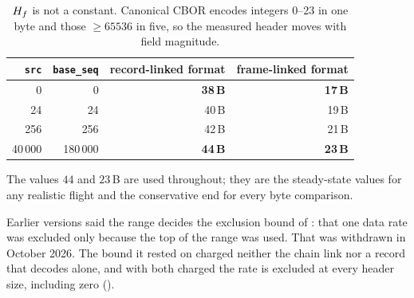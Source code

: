 \begin{table}[t]
\centering
\caption{$H_f$ is not a constant. Canonical CBOR encodes integers 0--23 in one byte and those
$\geq 65536$ in five, so the measured header moves with field magnitude.}
\label{tab:hf}
\begin{tabular}{rrrr}
\toprule
\texttt{src} & \texttt{base\_seq} & record-linked format & frame-linked format \\
\midrule
0      & 0       & \textbf{38\,B} & \textbf{17\,B} \\
24     & 24      & 40\,B & 19\,B \\
256    & 256     & 42\,B & 21\,B \\
40\,000 & 180\,000 & \textbf{44\,B} & \textbf{23\,B} \\
\bottomrule
\end{tabular}
\end{table}

The values $44$ and $23$\,B are used throughout; they are the steady-state values for any
realistic flight and the conservative end for every byte comparison.

\begin{remark}
Earlier versions said the range decides the exclusion bound of : that one data
rate was excluded only because the top of the range was used. That was withdrawn in October 2026.
The bound it rested on charged neither the chain link nor a record that decodes alone, and with
both charged the rate is excluded at every header size, including zero
().
\end{remark}
